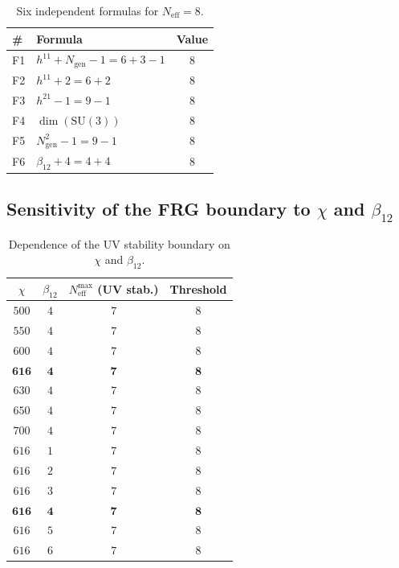 \documentclass[11pt,a4paper]{article}
\newcommand{\SU}{\ensuremath{\mathrm{SU}}}
\theoremstyle{definition}
\begin{document}
\begin{table}[ht]
\centering
\caption{Six independent formulas for $N_{\text{eff}} = 8$.}
\label{tab:app-frg-six-formulas}
\begin{tabular}{llc}
\toprule
\# & Formula & Value \\
\midrule
F1 & $h^{11} + N_{\text{gen}} - 1 = 6 + 3 - 1$ & $8$ \\
F2 & $h^{11} + 2 = 6 + 2$ & $8$ \\
F3 & $h^{21} - 1 = 9 - 1$ & $8$ \\
F4 & $\dim(\SU(3))$ & $8$ \\
F5 & $N_{\text{gen}}^2 - 1 = 9 - 1$ & $8$ \\
F6 & $\beta_{12} + 4 = 4 + 4$ & $8$ \\
\bottomrule
\end{tabular}
\end{table}

\subsection{Sensitivity of the FRG boundary to \texorpdfstring{$\chi$}{chi} and \texorpdfstring{$\beta_{12}$}{beta\_12}}
\label{app:frg-sensitivity}

\begin{table}[ht]
\centering
\caption{Dependence of the UV stability boundary on \texorpdfstring{$\chi$}{} and \texorpdfstring{$\beta_{12}$}{\_12}.}
\label{tab:app-frg-sensitivity}
\begin{tabular}{cccc}
\toprule
$\chi$ & $\beta_{12}$ & $N_{\text{eff}}^{\max}$ (UV stab.) & Threshold \\
\midrule
$500$ & $4$ & $7$ & $8$ \\
$550$ & $4$ & $7$ & $8$ \\
$600$ & $4$ & $7$ & $8$ \\
$\mathbf{616}$ & $\mathbf{4}$ & $\mathbf{7}$ & $\mathbf{8}$ \\
$630$ & $4$ & $7$ & $8$ \\
$650$ & $4$ & $7$ & $8$ \\
$700$ & $4$ & $7$ & $8$ \\
\midrule
$616$ & $1$ & $7$ & $8$ \\
$616$ & $2$ & $7$ & $8$ \\
$616$ & $3$ & $7$ & $8$ \\
$\mathbf{616}$ & $\mathbf{4}$ & $\mathbf{7}$ & $\mathbf{8}$ \\
$616$ & $5$ & $7$ & $8$ \\
$616$ & $6$ & $7$ & $8$ \\
\bottomrule
\end{tabular}
\end{table}
\end{document}
